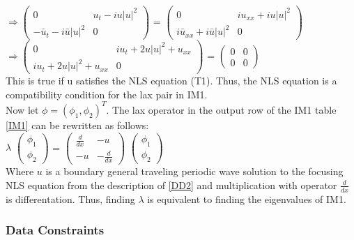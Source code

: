 \documentclass[12pt]{article}
\begin{document}
$ \Rightarrow \begin{pmatrix} 
0 & u_{t} - iu|u|^{2} \\
-\bar{u}_{t} - i\bar{u}|u|^{2} & 0
\end{pmatrix} $ = 
$ \begin{pmatrix} 
0 & iu_{xx} + iu|u|^{2} \\
i\bar{u}_{xx} + i \bar{u}|u|^{2} & 0
\end{pmatrix} $ \\ 
$ \Rightarrow \begin{pmatrix} 
0 & iu_{t} + 2u|u|^{2} + u_{xx} \\
iu_{t} + 2u|u|^{2} + u_{xx} & 0
\end{pmatrix} $ = 
$ \begin{pmatrix} 
0 & 0 \\
0 & 0
\end{pmatrix} $ \\ 

This is true if u satisfies the NLS equation (T1). Thus, the NLS equation is a 
compatibility 
condition for the lax pair in IM1. \\

Now let $\phi = (\phi_{1} , \phi_{2})^{T} $. The lax operator in the output row 
of the IM1 table \ref{IM1} can be rewritten as follows: \\  

$\lambda $
$ \begin{pmatrix} 
\phi_{1} \\
\phi_{2} 
\end{pmatrix} $ = 
$ \begin{pmatrix} 
\frac{d}{dx} & -u \\
-u & -\frac{d}{dx}
\end{pmatrix} $ 
$ \begin{pmatrix} 
\phi_{1} \\
\phi_{2} 
\end{pmatrix} $\\ 

Where $u$ is a boundary general traveling periodic wave solution to the 
focusing NLS equation from the description of \ref{DD2} and multiplication with 
operator $\frac{d}{dx}$ is differentation. Thus, finding $\lambda$ is 
equivalent to finding the eigenvalues of IM1. \\

\newpage
\subsubsection{Data Constraints} \label{sec_DataConstraints}    
\end{document}
